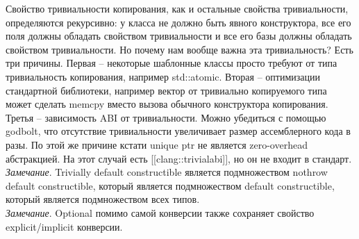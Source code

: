 \documentclass[12pt, a4paper]{article}
\begin{document}
Свойство тривиальности копирования, как и остальные свойства тривиальности, определяются рекурсивно: у класса не должно быть явного конструктора, все его поля должны обладать свойством тривиальности и все его базы должны обладать свойством тривиальности. Но почему нам вообще важна эта тривиальность? Есть три причины. Первая -- некоторые шаблонные классы просто требуют от типа тривиальность копирования, например std::atomic. Вторая -- оптимизации стандартной библиотеки, например вектор от тривиально копируемого типа может сделать memcpy вместо вызова обычного конструктора копирования. Третья -- зависимость ABI от тривиальности. Можно убедиться с помощью godbolt, что отсутствие тривиальности увеличивает размер ассемблерного кода в разы. По этой же причине кстати unique ptr не является zero-overhead абстракцией. На этот случай есть [[clang::trivial\textunderscore abi]], но он не входит в стандарт.\\
\textit{Замечание}. Trivially default constructible является подмножеством nothrow default constructible, который является подмножеством default constructible, который является подмножеством всех типов.\\
\textit{Замечание}. Optional помимо самой конверсии также сохраняет свойство explicit/implicit конверсии.
\end{document}
